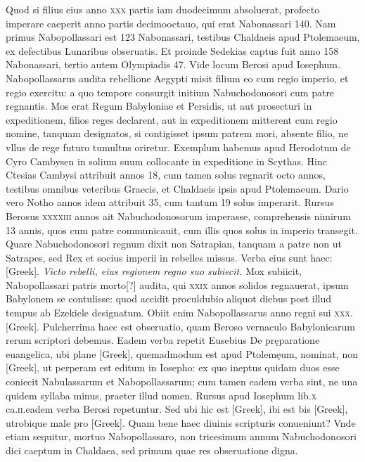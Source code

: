 Quod si filius eius anno \textsc{xxx} partis iam duodecimum
absoluerat, profecto imperare caeperit anno partis decimooctauo,
qui erat Nabonassari 140.
Nam primus Nabopollassari est 123 Nabonassari,
testibus Chaldaeis apud Ptolemaeum, ex defectibus Lunaribus
obseruatis.
Et proinde Sedekias captus fuit anno 158 Nabonassari,
tertio autem Olympiadis 47.
Vide locum Berosi apud Iosephum.
Nabopollassarus audita rebellione Aegypti misit filium eo
cum regio imperio, et regio exercitu: a quo tempore consurgit initium
Nabuchodonosori cum patre regnantis.
Mos erat Regum Babyloniae
et Persidis, ut aut prosecturi in expeditionem, filios reges declarent,
aut in expeditionem mitterent cum regio nomine, tanquam
designatos, si contigisset ipsum patrem mori, absente filio, ne
vllus de rege futuro tumultus oriretur.
Exemplum habemus apud
Herodotum de Cyro Cambysen in solium suum collocante in expeditione
in Scythas.
Hinc Ctesias Cambysi attribuit annos 18,
cum tamen solus regnarit octo annos, testibus omnibus veteribus
Graecis, et Chaldaeis ipsis apud Ptolemaeum.
Dario vero Notho annos
idem attribuit 35, cum tantum 19 solus imperarit.
Rursus Berosus
\textsc{xxxxiii} annos ait Nabuchodonosorum imperasse, comprehensis
nimirum 13 annis, quos cum patre communicauit, cum
illis quos solus in imperio transegit.
Quare Nabuchodonosori regnum
dixit non Satrapian, tanquam a patre non ut Satrapes, sed Rex
et socius imperii in rebelles missus.
Verba eius sunt haec: \textgreek{[Greek]}.
\textit{Victo rebelli, eius regionem regno suo subiecit.}
Mox subiicit, Nabopollassari patris morto[?]
audita, qui \textsc{xxix} annos solidos regnauerat, ipsum Babylonem se
contulisse: quod accidit proculdubio aliquot diebus post illud tempus
ab Ezekiele designatum.
Obiit enim Nabopollassarus anno regni
sui \textsc{xxx}.
\textgreek{[Greek]}.
Pulcherrima haec est obseruatio, quam Beroso vernaculo
Babylonicarum rerum scriptori debemus.
Eadem verba repetit Eusebius
De pręparatione euangelica, ubi plane \textgreek{[Greek]}, quemadmodum
est apud Ptolemęum, nominat, non \textgreek{[Greek]}, ut perperam
est editum in Iosepho: ex quo ineptus quidam duos esse coniecit
Nabulassarum et Nabopollassarum; cum tamen eadem verba sint, ne
una quidem syllaba minus, praeter illud nomen.
Rursus apud Iosephum
lib.\textsc{x} ca.\textsc{ii}.eadem verba Berosi repetuntur.
Sed ubi hic est \textgreek{[Greek]},
ibi est bis \textgreek{[Greek]}, utrobique male pro \textgreek{[Greek]}.
Quam bene haec diuinis scripturis conueniunt?
Vnde etiam sequitur, mortuo Nabopollassaro, non tricesimum
 annum Nabuchodonosori
dici caeptum in Chaldaea, sed primum quae res obseruatione
digna.

